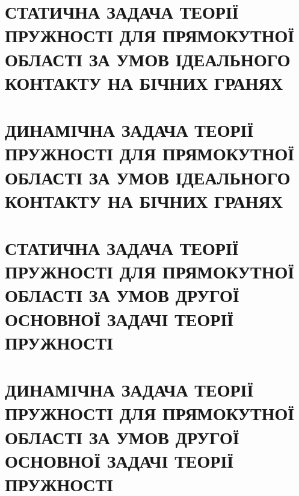 \documentclass[a4paper,14pt]{extarticle}
\numberwithin{equation}{section}
\begin{document}
\section{СТАТИЧНА ЗАДАЧА ТЕОРІЇ ПРУЖНОСТІ ДЛЯ ПРЯМОКУТНОЇ ОБЛАСТІ
ЗА УМОВ ІДЕАЛЬНОГО КОНТАКТУ НА БІЧНИХ ГРАНЯХ}

\newpage

\section{ДИНАМІЧНА ЗАДАЧА ТЕОРІЇ ПРУЖНОСТІ ДЛЯ ПРЯМОКУТНОЇ ОБЛАСТІ
ЗА УМОВ ІДЕАЛЬНОГО КОНТАКТУ НА БІЧНИХ ГРАНЯХ}

\newpage

\section{СТАТИЧНА ЗАДАЧА ТЕОРІЇ ПРУЖНОСТІ ДЛЯ ПРЯМОКУТНОЇ ОБЛАСТІ
ЗА УМОВ ДРУГОЇ ОСНОВНОЇ ЗАДАЧІ ТЕОРІЇ ПРУЖНОСТІ}

\newpage

\section{ДИНАМІЧНА ЗАДАЧА ТЕОРІЇ ПРУЖНОСТІ ДЛЯ ПРЯМОКУТНОЇ ОБЛАСТІ
ЗА УМОВ ДРУГОЇ ОСНОВНОЇ ЗАДАЧІ ТЕОРІЇ ПРУЖНОСТІ}

\newpage
\end{document}
